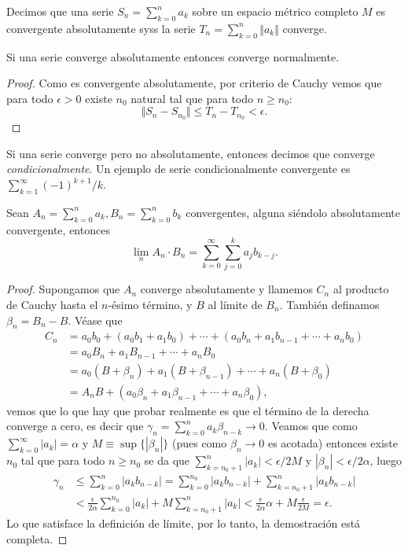 \documentclass[11pt,oneside,a4paper]{book}
\begin{document}
\begin{thm}
Decimos que una serie $S_n=\sum_{k=0}^n a_k$ sobre un espacio métrico completo $M$ es convergente absolutamente syss la serie $T_n=\sum_{k=0}^n\Vert a_k\Vert$ converge.

Si una serie converge absolutamente entonces converge normalmente.
\end{thm}
\begin{proof}
Como es convergente absolutamente, por criterio de Cauchy vemos que para todo $\epsilon\gt 0$ existe $n_0$ natural tal que para todo $n\geq n_0$:
$$\Vert S_n-S_{n_0}\Vert\leq T_n-T_{n_0}\lt\epsilon.$$
\end{proof}
Si una serie converge pero no absolutamente, entonces decimos que converge \textit{condicionalmente}. Un ejemplo de serie condicionalmente convergente es $\sum_{k=1}^\infty(-1)^{k+1}/k$.
\begin{thm}
Sean $A_n=\sum_{k=0}^n a_k,B_n=\sum_{k=0}^n b_k$ convergentes, alguna siéndolo absolutamente convergente, entonces
$$\lim_nA_n\cdot B_n=\sum_{k=0}^\infty\sum_{j=0}^k a_jb_{k-j}.$$
\end{thm}
\begin{proof}
Supongamos que $A_n$ converge absolutamente y llamemos $C_n$ al producto de Cauchy hasta el $n$-ésimo término, y $B$ al límite de $B_n$. También definamos $\beta_n=B_n-B$. Véase que
\begin{align*}
C_n&=a_0b_0+(a_0b_1+a_1b_0)+\cdots+(a_0b_n+a_1b_{n-1}+\cdots+a_nb_0)\\
&=a_0B_n+a_1B_{n-1}+\cdots+a_nB_0\\
&=a_0(B+\beta_n)+a_1(B+\beta_{n-1})+\cdots+a_n(B+\beta_0)\\
&=A_nB+(a_0\beta_n+a_1\beta_{n-1}+\cdots+a_n\beta_0),
\end{align*}
vemos que lo que hay que probar realmente es que el término de la derecha converge a cero, es decir que $\gamma_n=\sum_{k=0}^na_k\beta_{n-k}\to 0$. Veamos que como $\sum_{k=0}^\infty|a_k|=\alpha$ y $M\equiv\sup\{|\beta_n|\}$ (pues como $\beta_n\to0$ es acotada) entonces existe $n_0$ tal que para todo $n\geq n_0$ se da que $\sum_{k=n_0+1}^n|a_k|\lt\epsilon/2M$ y $|\beta_n|\lt\epsilon/2\alpha$, luego
\begin{align*}
\gamma_n&\leq\sum_{k=0}^n|a_kb_{n-k}|=\sum_{k=0}^{n_0}|a_kb_{n-k}|+\sum_{k=n_0+1}^n|a_kb_{n-k}|\\
&\lt\frac{\epsilon}{2\alpha}\sum_{k=0}^{n_0}|a_k|+M\sum_{k=n_0+1}^n|a_k|\lt\frac{\epsilon}{2\alpha}\alpha+M\frac{\epsilon}{2M}=\epsilon.
\end{align*}
Lo que satisface la definición de límite, por lo tanto, la demostración está completa.
\end{proof}
\end{document}
